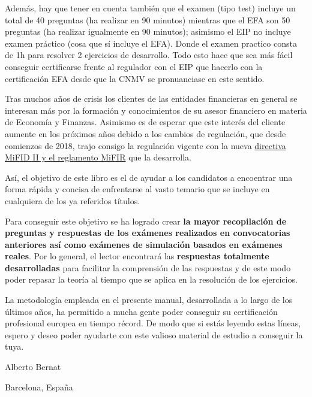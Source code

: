 \documentclass[
  letterpaper,
  DIV=11,
  numbers=noendperiod]{scrreprt}
\begin{document}
Además, hay que tener en cuenta también que el examen (tipo test)
incluye un total de 40 preguntas (ha realizar en 90 minutos) mientras
que el EFA son 50 preguntas (ha realizar igualmente en 90 minutos);
asimismo el EIP no incluye examen práctico (cosa que sí incluye el EFA).
Donde el examen practico consta de 1h para resolver 2 ejercicios de
desarrollo. Todo esto hace que sea más fácil conseguir certificarse
frente al regulador con el EIP que hacerlo con la certificación EFA
desde que la CNMV se pronuanciase en este sentido.

Tras muchos años de crisis los clientes de las entidades financieras en
general se interesan más por la formación y conocimientos de su asesor
financiero en materia de Economía y Finanzas. Asimismo es de esperar que
este interés del cliente aumente en los próximos años debido a los
cambios de regulación, que desde comienzos de 2018, trajo consigo la
regulación vigente con la nueva
\href{http://cnmv.es/portal/MIFIDII_MIFIR/MapaMiFID.aspx}{directiva
MiFID II y el reglamento MiFIR} que la desarrolla.

Así, el objetivo de este libro es el de ayudar a los candidatos a
encoentrar una forma rápida y concisa de enfrentarse al vasto temario
que se incluye en cualquiera de los ya referidos títulos.

Para conseguir este objetivo se ha logrado crear \textbf{la mayor
recopilación de preguntas y respuestas de los exámenes realizados en
convocatorias anteriores así como exámenes de simulación basados en
exámenes reales}. Por lo general, el lector encontrará las
\textbf{respuestas totalmente desarrolladas} para facilitar la
comprensión de las respuestas y de este modo poder repasar la teoría al
tiempo que se aplica en la resolución de los ejercicios.

La metodología empleada en el presente manual, desarrollada a lo largo
de los últimos años, ha permitido a mucha gente poder conseguir su
certificación profesional europea en tiempo récord. De modo que si estás
leyendo estas líneas, espero y deseo poder ayudarte con este valioso
material de estudio a conseguir la tuya.

Alberto Bernat

Barcelona, España
\end{document}
